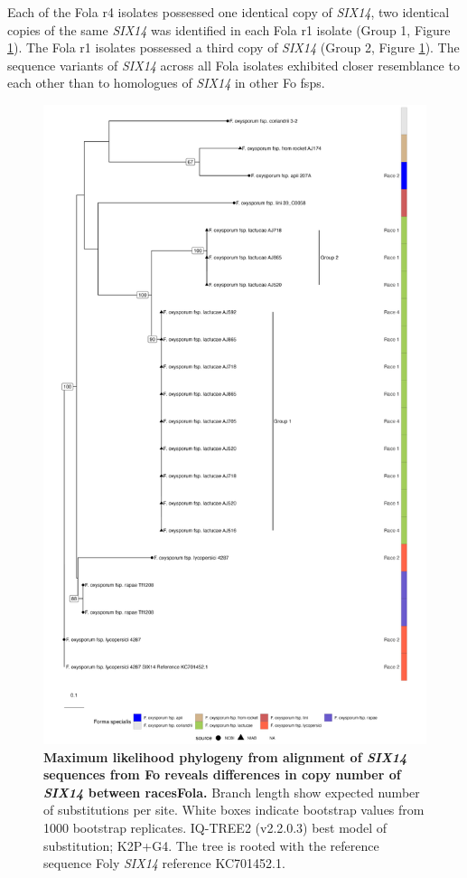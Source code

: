 Each of the \ac{Fola} \ac{r4} isolates possessed one identical copy of \textit{SIX14}, two identical copies of the same \textit{SIX14} was identified in each \ac{Fola} \ac{r1} isolate (Group 1, Figure \ref{fig:lactucae-six14}). The \ac{Fola} \ac{r1} isolates possessed a third copy of \textit{SIX14} (Group 2, Figure \ref{fig:lactucae-six14}). The sequence variants of \textit{SIX14} across all \ac{Fola} isolates exhibited closer resemblance to each other than to homologues of \textit{SIX14} in other \ac{Fo} \acp{fsp}.

\begin{figure}[htp!]
    \centering
    \includegraphics[width=12cm]{Figures/lactucaeSIX14tree.png}
    \captionsetup{width=\textwidth}
    \caption[Maximum likelihood phylogeny from alignment of \textit{SIX14} sequences from \acl{Fo} reveals differences in copy number of \textit{SIX14} between races of \acl{Fola}.]{\textbf{Maximum likelihood phylogeny from alignment of \textit{SIX14} sequences from \acf{Fo} reveals differences in copy number of \textit{SIX14} between races\acf{Fola}.}  Branch length show expected number of substitutions per site. White boxes indicate bootstrap values from 1000 bootstrap replicates. IQ-TREE2 (v2.2.0.3) best model of substitution; K2P+G4. The tree is rooted with the reference sequence \ac{Foly} \textit{SIX14} reference KC701452.1.}
    \label{fig:lactucae-six14}
\end{figure}

